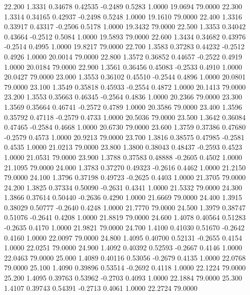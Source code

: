   22.200   1.3331   0.34678   0.42535  -0.2489   0.5283   1.0000  19.0694  79.0000
  22.300   1.3314   0.34165   0.42937  -0.2498   0.5248   1.0000  19.1610  79.0000
  22.400   1.3316   0.33917   0.43317  -0.2506   0.5178   1.0000  19.3432  79.0000
  22.500   1.3353   0.34042   0.43664  -0.2512   0.5084   1.0000  19.5893  79.0000
  22.600   1.3434   0.34682   0.43976  -0.2514   0.4995   1.0000  19.8217  79.0000
  22.700   1.3583   0.37283   0.44232  -0.2512   0.4926   1.0000  20.0014  79.0000
  22.800   1.3572   0.36852   0.44657  -0.2522   0.4919   1.0000  20.0184  79.0000
  22.900   1.3561   0.36456   0.45083  -0.2533   0.4910   1.0000  20.0427  79.0000
  23.000   1.3553   0.36102   0.45510  -0.2544   0.4896   1.0000  20.0801  79.0000
  23.100   1.3549   0.35818   0.45933  -0.2554   0.4872   1.0000  20.1413  79.0000
  23.200   1.3553   0.35663   0.46345  -0.2564   0.4836   1.0000  20.2366  79.0000
  23.300   1.3569   0.35664   0.46741  -0.2572   0.4789   1.0000  20.3586  79.0000
  23.400   1.3596   0.35792   0.47118  -0.2579   0.4733   1.0000  20.5036  79.0000
  23.500   1.3642   0.36084   0.47465  -0.2584   0.4668   1.0000  20.6730  79.0000
  23.600   1.3759   0.37386   0.47680  -0.2579   0.4573   1.0000  20.9213  79.0000
  23.700   1.3816   0.38575   0.47985  -0.2581   0.4535   1.0000  21.0213  79.0000
  23.800   1.3800   0.38043   0.48437  -0.2593   0.4523   1.0000  21.0531  79.0000
  23.900   1.3788   0.37583   0.48888  -0.2605   0.4502   1.0000  21.1095  79.0000
  24.000   1.3783   0.37270   0.49323  -0.2616   0.4462   1.0000  21.2150  79.0000
  24.100   1.3796   0.37198   0.49723  -0.2625   0.4403   1.0000  21.3705  79.0000
  24.200   1.3825   0.37334   0.50090  -0.2631   0.4341   1.0000  21.5332  79.0000
  24.300   1.3866   0.37614   0.50440  -0.2636   0.4290   1.0000  21.6669  79.0000
  24.400   1.3915   0.38029   0.50777  -0.2640   0.4248   1.0000  21.7770  79.0000
  24.500   1.3979   0.38747   0.51076  -0.2641   0.4208   1.0000  21.8819  79.0000
  24.600   1.4078   0.40564   0.51283  -0.2635   0.4170   1.0000  21.9821  79.0000
  24.700   1.4100   0.41030   0.51670  -0.2642   0.4160   1.0000  22.0097  79.0000
  24.800   1.4095   0.40700   0.52131  -0.2655   0.4154   1.0000  22.0251  79.0000
  24.900   1.4092   0.40392   0.52593  -0.2667   0.4146   1.0000  22.0463  79.0000
  25.000   1.4089   0.40116   0.53056  -0.2679   0.4135   1.0000  22.0768  79.0000
  25.100   1.4090   0.39896   0.53514  -0.2692   0.4118   1.0000  22.1224  79.0000
  25.200   1.4095   0.39763   0.53962  -0.2703   0.4093   1.0000  22.1884  79.0000
  25.300   1.4107   0.39743   0.54391  -0.2713   0.4061   1.0000  22.2724  79.0000
